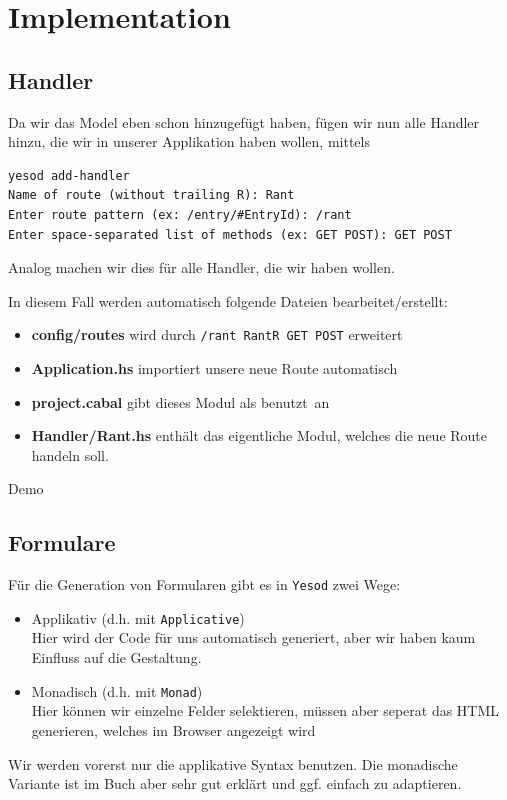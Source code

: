 \documentclass{beamer}
\begin{document}
\section{Implementation}

\subsection{Handler}

\begin{frame}[fragile]
Da wir das Model eben schon hinzugefügt haben, fügen wir nun alle Handler hinzu, die wir in unserer Applikation haben wollen, mittels
\footnotesize
\begin{verbatim}
yesod add-handler
Name of route (without trailing R): Rant
Enter route pattern (ex: /entry/#EntryId): /rant
Enter space-separated list of methods (ex: GET POST): GET POST
\end{verbatim}
\normalsize
\pause
Analog machen wir dies für alle Handler, die wir haben wollen.\\\par\pause
In diesem Fall werden automatisch folgende Dateien bearbeitet/erstellt:
\begin{itemize}
 \item \textbf{config/routes} wird durch \texttt{/rant RantR GET POST} erweitert
 \pause
 \item \textbf{Application.hs} importiert unsere neue Route automatisch
 \pause
 \item \textbf{project.cabal} gibt dieses Modul als \glqq benutzt\grqq \ an
 \pause
 \item \textbf{Handler/Rant.hs} enthält das eigentliche Modul, welches die neue Route handeln soll.
\end{itemize}

\end{frame}

\begin{frame}
Demo
\end{frame}

\subsection{Formulare}

\begin{frame}[fragile]
Für die Generation von Formularen gibt es in \texttt{Yesod} zwei Wege:\pause
\begin{itemize}
 \item Applikativ (d.h. mit \texttt{Applicative})\pause\\
       Hier wird der Code für uns automatisch generiert, aber wir haben kaum Einfluss auf die Gestaltung.
 \pause
 \item Monadisch (d.h. mit \texttt{Monad})\pause\\
       Hier können wir einzelne Felder selektieren, müssen aber seperat das HTML generieren, welches im Browser angezeigt wird
\end{itemize}
\pause
Wir werden vorerst nur die applikative Syntax benutzen. Die monadische Variante ist im Buch aber sehr gut erklärt und ggf. einfach zu adaptieren.
\end{frame}
\end{document}
